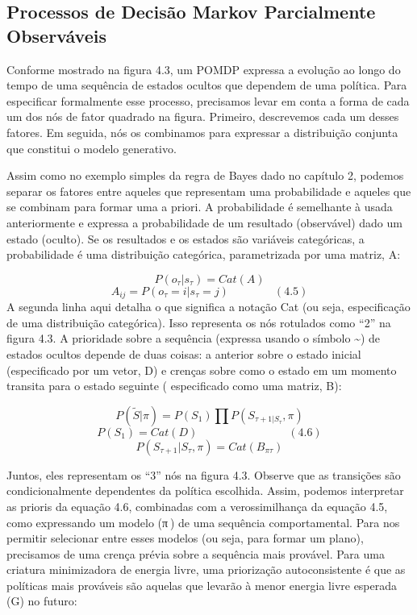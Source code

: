 \documentclass[
  12pt,
]{book}
\begin{document}
\hypertarget{processos-de-decisuxe3o-markov-parcialmente-observuxe1veis}{%
\subsection{Processos de Decisão Markov Parcialmente Observáveis}\label{processos-de-decisuxe3o-markov-parcialmente-observuxe1veis}}

Conforme mostrado na figura 4.3, um POMDP expressa a evolução ao longo
do tempo de uma sequência de estados ocultos que dependem de uma
política. Para especificar formalmente esse processo, precisamos levar
em conta a forma de cada um dos nós de fator quadrado na figura.
Primeiro, descrevemos cada um desses fatores. Em seguida, nós os
combinamos para expressar a distribuição conjunta que constitui o modelo
generativo.

Assim como no exemplo simples da regra de Bayes dado no capítulo 2,
podemos separar os fatores entre aqueles que representam uma
probabilidade e aqueles que se combinam para formar uma a priori. A
probabilidade é semelhante à usada anteriormente e expressa a
probabilidade de um resultado (observável) dado um estado (oculto). Se
os resultados e os estados são variáveis categóricas, a probabilidade é
uma distribuição categórica, parametrizada por uma matriz, A:

\[P(o_\tau|s_\tau)=Cat(A)\]
\[A_{ij}=P(o_\tau=i | s_\tau = j) \qquad \qquad (4.5)\] A segunda linha
aqui detalha o que significa a notação Cat (ou seja, especificação de
uma distribuição categórica). Isso representa os nós rotulados como ``2''
na figura 4.3. A prioridade sobre a sequência (expressa usando o símbolo
\textasciitilde) de estados ocultos depende de duas coisas: a anterior sobre o estado
inicial (especificado por um vetor, D) e crenças sobre como o estado em
um momento transita para o estado seguinte ( especificado como uma
matriz, B):

\[P(\tilde S|\pi)=P(S_1)\prod P(S_{\tau+1 | S_{\tau}}, \pi)\]
\[P(S_1)=Cat(D) \qquad\qquad\qquad\qquad(4.6)\]
\[P(S_{\tau+1}|S_\tau,\pi)=Cat(B_{\pi\tau})\]

Juntos, eles representam os ``3'' nós na figura 4.3. Observe que as
transições são condicionalmente dependentes da política escolhida.
Assim, podemos interpretar as prioris da equação 4.6, combinadas com a
verossimilhança da equação 4.5, como expressando um modelo (π ) de uma
sequência comportamental. Para nos permitir selecionar entre esses
modelos (ou seja, para formar um plano), precisamos de uma crença prévia
sobre a sequência mais provável. Para uma criatura minimizadora de
energia livre, uma priorização autoconsistente é que as políticas mais
prováveis são aquelas que levarão à menor energia livre esperada (G) no
futuro:
\end{document}
